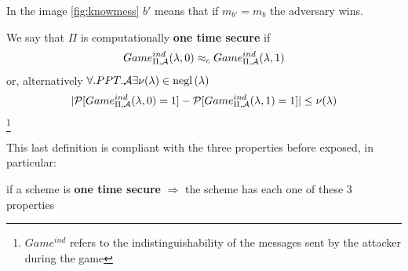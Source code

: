 In the image \ref{fig:knowmess} $b'$ means that if $m_{b'}=m_{b}$ the
adversary wins.
\begin{definition}
    We say that $\Pi$ is computationally \textbf{one time secure }  if 
    \[
        Game_{\Pi, \mathcal{A}}^{ind}(\lambda, 0) \approx_{c} Game_{\Pi, \mathcal{A}}
        ^{ind}(\lambda,1)
    \]  
    or, alternatively $ \forall.PPT.\mathcal{A} \exists \nu(\lambda) \in \mathrm{negl}\left({\lambda}\right)$
    \[
        | \mathcal{P} [ Game_{\Pi, \mathcal{A}}^{ind}(\lambda, 0)=1 ] - \mathcal{P} [ Game_{\Pi,
        \mathcal{A}}^{ind}(\lambda, 1)=1 ]   |   \leq  \nu(\lambda) 
    \]\footnote{$Game^{ind}$ refers to the indistinguishability of the messages
sent by the attacker during the game}
\end{definition}



This last definition is compliant with the three properties before exposed, in particular:

if a scheme is \textbf{one time secure} $\Rightarrow$ the scheme has
each one of these 3 properties

